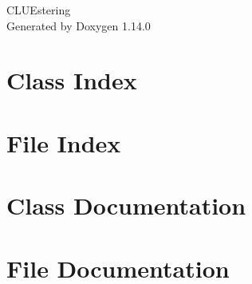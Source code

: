 \documentclass[twoside]{book}
\newcommand{\+}{\discretionary{\mbox{\scriptsize$\hookleftarrow$}}{}{}}
\newcommand{\clearemptydoublepage}{%
    \newpage{\pagestyle{empty}\cleardoublepage}%
  }
\begin{document}
  \raggedbottom
    \hypersetup{pageanchor=false,
                bookmarksnumbered=true,
                pdfencoding=unicode
               }
  \begin{titlepage}
  \vspace*{7cm}
  \begin{center}%
  {\Large CLUEstering}\\
  \vspace*{1cm}
  {\large Generated by Doxygen 1.14.0}\\
  \end{center}
  \end{titlepage}
  \clearemptydoublepage
  \tableofcontents
  \clearemptydoublepage
  \hypersetup{pageanchor=true}




\chapter{Class Index}

\chapter{File Index}

\chapter{Class Documentation}












\chapter{File Documentation}












  \backmatter
  \newpage
  \clearemptydoublepage
  \printindex
\end{document}
